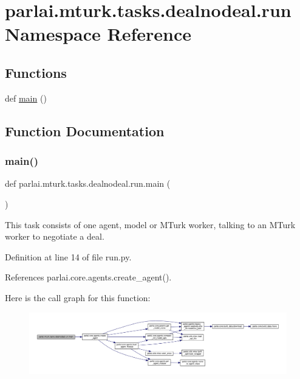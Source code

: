 \hypertarget{namespaceparlai_1_1mturk_1_1tasks_1_1dealnodeal_1_1run}{}\section{parlai.\+mturk.\+tasks.\+dealnodeal.\+run Namespace Reference}
\label{namespaceparlai_1_1mturk_1_1tasks_1_1dealnodeal_1_1run}
\subsection*{Functions}
\begin{DoxyCompactItemize}
\item 
def \hyperlink{namespaceparlai_1_1mturk_1_1tasks_1_1dealnodeal_1_1run_aafb6d1c8bf3b37bc874ee8d8dcbecce8}{main} ()
\end{DoxyCompactItemize}


\subsection{Function Documentation}
\mbox{\label{namespaceparlai_1_1mturk_1_1tasks_1_1dealnodeal_1_1run_aafb6d1c8bf3b37bc874ee8d8dcbecce8}} 
\subsubsection{\texorpdfstring{main()}{main()}}
{\footnotesize\ttfamily def parlai.\+mturk.\+tasks.\+dealnodeal.\+run.\+main (\begin{DoxyParamCaption}{ }\end{DoxyParamCaption})}

\begin{DoxyVerb}This task consists of one agent, model or MTurk worker, talking to an
MTurk worker to negotiate a deal.
\end{DoxyVerb}
 

Definition at line 14 of file run.\+py.



References parlai.\+core.\+agents.\+create\+\_\+agent().

Here is the call graph for this function\+:
\nopagebreak
\begin{figure}[H]
\begin{center}
\leavevmode
\includegraphics[width=350pt]{namespaceparlai_1_1mturk_1_1tasks_1_1dealnodeal_1_1run_aafb6d1c8bf3b37bc874ee8d8dcbecce8_cgraph}
\end{center}
\end{figure}
